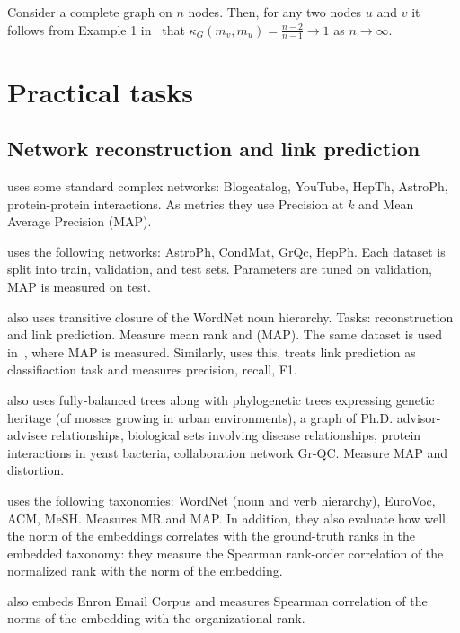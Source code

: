 \documentclass{article}
\begin{document}
Consider a complete graph on $n$ nodes. Then, for any two nodes $u$ and $v$ it follows from Example 1 in~\cite{jost2014ollivier} that $\kappa_G(m_v, m_u) = \frac{n-2}{n-1} \to 1$ as $n \to \infty$.


                     
\section{Practical tasks}

\subsection{Network reconstruction and link prediction}

\cite{goyal2018graph} uses some standard complex networks: Blogcatalog, YouTube, HepTh, AstroPh, protein-protein interactions. As metrics they use Precision at $k$ and Mean Average Precision (MAP).

\cite{nickel2017poincare} uses the following networks: AstroPh, CondMat, GrQc, HepPh. Each dataset is split into train, validation, and test sets. Parameters are tuned on validation, MAP is measured on test. 

\cite{nickel2017poincare} also uses transitive closure of the WordNet noun hierarchy. Tasks: reconstruction and link prediction. Measure mean rank and (MAP).  The same dataset is used in~\cite{sala2018representation}, where MAP is measured. Similarly, \cite{ganea2018hyperbolic} uses this, treats link prediction as classifiaction task and measures precision, recall, F1.

\cite{sala2018representation} also uses fully-balanced trees along with phylogenetic trees expressing genetic heritage (of mosses growing in urban
environments), a graph of Ph.D. advisor-advisee relationships, biological sets involving disease relationships, protein interactions in yeast bacteria, collaboration network Gr-QC. Measure MAP and distortion. 

\cite{nickel2018learning} uses the following taxonomies: WordNet (noun and verb hierarchy), EuroVoc, ACM, MeSH. Measures MR and MAP. In addition, they also evaluate how well the norm of the embeddings  correlates with
the ground-truth ranks in the embedded taxonomy: they measure the Spearman rank-order correlation of the normalized rank with the norm of the embedding. 
 
\cite{nickel2018learning} also embeds Enron Email Corpus and measures Spearman correlation of the norms of the embedding with
the organizational rank.
\end{document}
